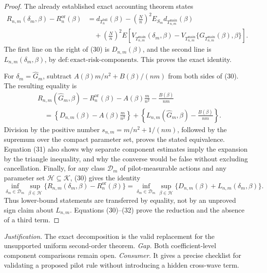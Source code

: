 \documentclass{article}
\begin{document}
\begin{proof}
The already established exact accounting theorem states
\[
\begin{aligned}
R_{n,m}(\delta_m,\beta)-R_n^{\mathrm{or}}(\beta)
&=d_{T_n^{\mathrm{full}}}(\beta)
-\left(\frac Nn\right)^2
E_{S_m}d_{T_{n,m}^{\mathrm{main}}}(\beta)\\
&\quad+
\left(\frac Nn\right)^2E\!\left[
V_{T_{n,m}^{\mathrm{main}}}(\delta_m,\beta)
-V_{T_{n,m}^{\mathrm{main}}}
\{G_{T_{n,m}^{\mathrm{main}}}(\beta),\beta\}
\right].
\end{aligned}
\tag{30}
\]
The first line on the right of (30) is \(D_{n,m}(\beta)\), and the second line is \(L_{n,m}(\delta_m,\beta)\), by
\(\mathrm{def{:}exact\text{-}risk\text{-}components}\).  This proves the exact identity.

For \(\delta_m=\widehat G_m\), subtract
\(A(\beta)m/n^2+B(\beta)/(nm)\) from both sides of (30).  The resulting equality is
\[
\begin{aligned}
&R_{n,m}(\widehat G_m,\beta)-R_n^{\mathrm{or}}(\beta)
-A(\beta)\frac m{n^2}-\frac{B(\beta)}{nm}\\
&\quad=
\left\{D_{n,m}(\beta)-A(\beta)\frac m{n^2}\right\}
+\left\{L_{n,m}(\widehat G_m,\beta)-\frac{B(\beta)}{nm}\right\}.
\end{aligned}
\tag{31}
\]
Division by the positive number
\(s_{n,m}=m/n^2+1/(nm)\), followed by the supremum over the compact parameter set, proves the stated equivalence.  Equation (31) also shows why separate component estimates imply the expansion by the triangle inequality, and why the converse would be false without excluding cancellation.  Finally, for any class \(\mathcal D_m\) of pilot-measurable actions and any parameter set \(\mathcal H\subseteq\mathcal K\), (30) gives the identity
\[
\inf_{\delta_m\in\mathcal D_m}\sup_{\beta\in\mathcal H}
\{R_{n,m}(\delta_m,\beta)-R_n^{\mathrm{or}}(\beta)\}
=
\inf_{\delta_m\in\mathcal D_m}\sup_{\beta\in\mathcal H}
\{D_{n,m}(\beta)+L_{n,m}(\delta_m,\beta)\}.
\tag{32}
\]
Thus lower-bound statements are transferred by equality, not by an unproved sign claim about \(L_{n,m}\).  Equations (30)--(32) prove the reduction and the absence of a third term.
\end{proof}
\par\smallskip\noindent \textit{Justification.} The exact decomposition is the valid replacement for the unsupported uniform second-order theorem. \textit{Gap.} Both coefficient-level component comparisons remain open. \textit{Consumer.} It gives a precise checklist for validating a proposed pilot rule without introducing a hidden cross-wave term.
\end{document}
